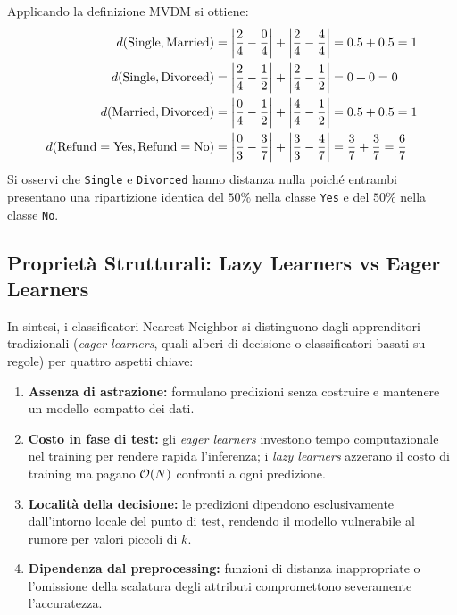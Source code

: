 \begin{example}
Applicando la definizione MVDM si ottiene:
\begin{align*}
    d(\text{Single}, \text{Married}) &= \left|\frac{2}{4} - \frac{0}{4}\right| + \left|\frac{2}{4} - \frac{4}{4}\right| = 0.5 + 0.5 = 1 \\
    d(\text{Single}, \text{Divorced}) &= \left|\frac{2}{4} - \frac{1}{2}\right| + \left|\frac{2}{4} - \frac{1}{2}\right| = 0 + 0 = 0 \\
    d(\text{Married}, \text{Divorced}) &= \left|\frac{0}{4} - \frac{1}{2}\right| + \left|\frac{4}{4} - \frac{1}{2}\right| = 0.5 + 0.5 = 1 \\
    d(\text{Refund}=\text{Yes}, \text{Refund}=\text{No}) &= \left|\frac{0}{3} - \frac{3}{7}\right| + \left|\frac{3}{3} - \frac{4}{7}\right| = \frac{3}{7} + \frac{3}{7} = \frac{6}{7}
\end{align*}
Si osservi che \texttt{Single} e \texttt{Divorced} hanno distanza nulla poich\'e entrambi presentano una ripartizione identica del $50\%$ nella classe \texttt{Yes} e del $50\%$ nella classe \texttt{No}.
\end{example}

\FloatBarrier
\subsection{Propriet\`a Strutturali: Lazy Learners vs Eager Learners}
\label{subsec:dm-knn-lazy-eager}

In sintesi, i classificatori Nearest Neighbor si distinguono dagli apprenditori tradizionali (\textit{eager learners}, quali alberi di decisione o classificatori basati su regole) per quattro aspetti chiave:
\begin{enumerate}
    \item \textbf{Assenza di astrazione:} formulano predizioni senza costruire e mantenere un modello compatto dei dati.
    \item \textbf{Costo in fase di test:} gli \textit{eager learners} investono tempo computazionale nel training per rendere rapida l'inferenza; i \textit{lazy learners} azzerano il costo di training ma pagano $\mathcal{O}\!\left(N\right)$ confronti a ogni predizione.
    \item \textbf{Localit\`a della decisione:} le predizioni dipendono esclusivamente dall'intorno locale del punto di test, rendendo il modello vulnerabile al rumore per valori piccoli di $k$.
    \item \textbf{Dipendenza dal preprocessing:} funzioni di distanza inappropriate o l'omissione della scalatura degli attributi compromettono severamente l'accuratezza.
\end{enumerate}

